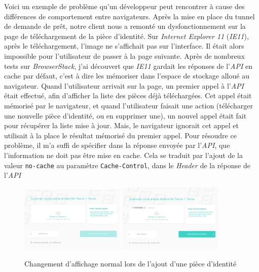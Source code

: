 \documentclass[12pt,a4paper]{article}
\begin{document}
  Voici un exemple de problème qu'un développeur peut rencontrer à cause
  des différences de comportement entre navigateurs. Après la mise en
  place du tunnel de demande de prêt, notre client nous a remonté un
  dysfonctionnement sur la page de téléchargement de la pièce d'identité.
  Sur \emph{Internet Explorer 11} (\emph{IE11}), après le téléchargement,
  l'image ne s'affichait pas sur l'interface. Il était alors impossible
  pour l'utilisateur de passer à la page suivante. Après de nombreux tests
  sur \emph{BrowserStack}, j'ai découvert que \emph{IE11} gardait les
  réponses de l'\emph{API} en cache par défaut, c'est à dire les mémoriser
  dans l'espace de stockage alloué au navigateur. Quand l'utilisateur
  arrivait sur la page, un premier appel à l'\emph{API} était effectué,
  afin d'afficher la liste des pièces déjà téléchargées. Cet appel était
  mémorisé par le navigateur, et quand l'utilisateur faisait une action
  (télécharger une nouvelle pièce d'identité, ou en supprimer une), un
  nouvel appel était fait pour récupérer la liste mise à jour. Mais, le
  navigateur ignorait cet appel et utilisait à la place le résultat
  mémorisé du premier appel. Pour résoudre ce problème, il m'a suffi de
  spécifier dans la réponse envoyée par l'\emph{API}, que l'information ne
  doit pas être mise en cache. Cela se traduit par l'ajout de la valeur
  \texttt{no-cache} au paramètre \texttt{Cache-Control}, dans le
  \emph{Header} de la réponse de l'\emph{API}

  \bigskip

  \begin{figure}[h]
    \centering
    \includegraphics[width=5cm]{figures/finfrog-1.png}
    \includegraphics[width=5cm]{figures/finfrog-2.png}
    \caption{Changement d'affichage normal lors de l'ajout d'une pièce d'identité}
  \end{figure}
\end{document}
